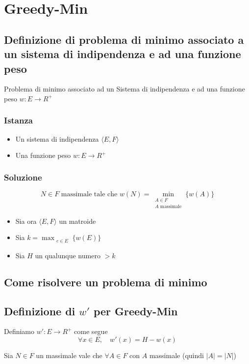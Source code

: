 \chapter{Greedy-Min}

\section{Definizione di problema di minimo associato a un sistema di indipendenza e ad una funzione peso}
Problema di minimo associato ad un Sistema di indipendenza e ad una funzione peso $w : E \to R^+$
\subsection{Istanza}
\begin{itemize}
    \item Un sistema di indipendenza $\langle E,F \rangle$
    \item Una funzione peso $w: E \to R^+$
\end{itemize}

\subsection{Soluzione}

{
    \large
    $$
    N \in F \text{ massimale tale che } w(N) = \min_{\substack{A \in F \\ A \text{ massimale}}}\{w(A)\} 
    $$
}

\begin{itemize}
    \item Sia ora $\langle E,F \rangle$ un matroide
    \item Sia $k = \max_{\substack{e \in E}}\{w(E)\}$
    \item Sia $H$ un qualunque numero $>k$
\end{itemize}

\section{Come risolvere un problema di minimo}
\section{Definizione di $w'$ per Greedy-Min}
Definiamo $w' : E \to R^+$ come segue
{
    \large
    $$
    \forall x \in E,\quad w'(x) = H - w(x)
    $$
}

Sia $N \in F$ un massimale vale che $\forall A \in F$ con $A$ massimale (quindi $|A| = |N|$)

